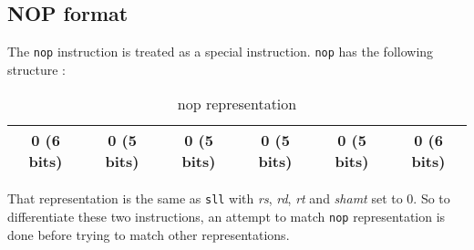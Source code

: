 \subsection*{NOP format}

	The \verb?nop? instruction is treated as a special instruction. \verb?nop? has the following structure : 
	\begin{table}[H]
	\centering
	\begin{tabular}{|c|c|c|c|c|c|}
	\hline 
	0 (6 bits) & 0 (5 bits) & 0 (5 bits) & 0 (5 bits) & 0 (5 bits) & 0 (6 bits) \\ 
	\hline 
	\end{tabular} 
	\caption{nop representation}
	\end{table}
	
	That representation is the same as \verb?sll? with \textit{rs}, \textit{rd}, \textit{rt} and \textit{shamt} set to 0. So to differentiate these two instructions, an attempt to match \verb?nop? representation is done before trying to match other representations.
